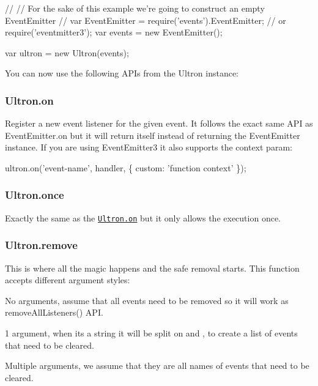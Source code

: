 \begin{DoxyCode}
//
// For the sake of this example we're going to construct an empty EventEmitter
//
var EventEmitter = require('events').EventEmitter; // or require('eventmitter3');
var events = new EventEmitter();

var ultron = new Ultron(events);
\end{DoxyCode}


You can now use the following A\+PI\textquotesingle{}s from the Ultron instance\+:

\subsubsection*{Ultron.\+on}

Register a new event listener for the given event. It follows the exact same A\+PI as {\ttfamily Event\+Emitter.\+on} but it will return itself instead of returning the Event\+Emitter instance. If you are using Event\+Emitter3 it also supports the context param\+:


\begin{DoxyCode}
ultron.on('event-name', handler, \{ custom: 'function context' \});
\end{DoxyCode}


\subsubsection*{Ultron.\+once}

Exactly the same as the \href{#ultronon}{\tt Ultron.\+on} but it only allows the execution once.

\subsubsection*{Ultron.\+remove}

This is where all the magic happens and the safe removal starts. This function accepts different argument styles\+:


\begin{DoxyItemize}
\item No arguments, assume that all events need to be removed so it will work as {\ttfamily remove\+All\+Listeners()} A\+PI.
\item 1 argument, when it\textquotesingle{}s a string it will be split on and {\ttfamily ,} to create a list of events that need to be cleared.
\item Multiple arguments, we assume that they are all names of events that need to be cleared.
\end{DoxyItemize}


